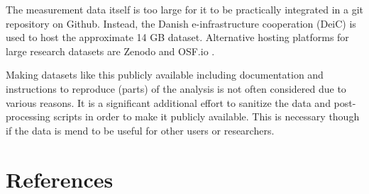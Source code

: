 \documentclass[a4paper]{jpconf}
\begin{document}
The measurement data itself is too large for it to be practically integrated in a git repository on Github. Instead, the Danish e-infrastructure cooperation (DeiC) \cite{deic:datamanagement} is used to host the approximate 14 GB dataset. Alternative hosting platforms for large research datasets are Zenodo \cite{zenodo} and OSF.io \cite{osf}. 

Making datasets like this publicly available including documentation and instructions to reproduce (parts) of the analysis is not often considered due to various reasons. It is a significant additional effort to sanitize the data and post-processing scripts in order to make it publicly available. This is necessary though if the data is mend to be useful for other users or researchers. %


\section*{References}

\begingroup
\raggedright
%



%
%
%
%
%

\endgroup
\end{document}
